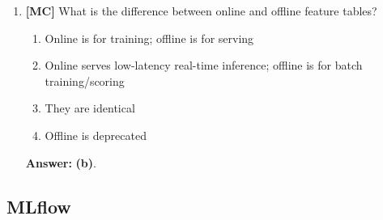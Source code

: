 \documentclass[11pt]{article}
\begin{document}
\begin{enumerate}[leftmargin=*, label=\textbf{Q\arabic*.}]
		\item \textbf{[MC]} What is the difference between online and offline feature tables?
		\begin{enumerate}[label=(\alph*)]
			\item Online is for training; offline is for serving
			\item Online serves low-latency real-time inference; offline is for batch training/scoring
			\item They are identical
			\item Offline is deprecated
		\end{enumerate}
		
		\textbf{Answer:} \textbf{(b)}.
		
	\end{enumerate}
	
	\subsection*{MLflow}
	
\end{document}
